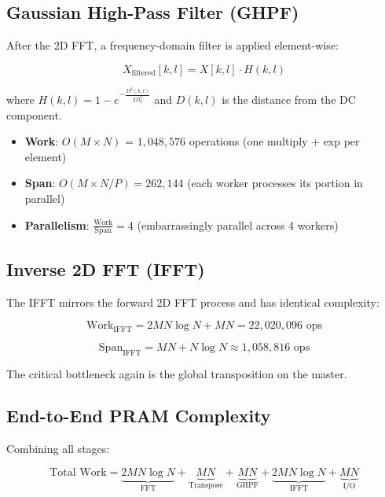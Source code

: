 \documentclass[11pt,a4paper]{article}
\begin{document}
\subsection{Gaussian High-Pass Filter (GHPF)}

After the 2D FFT, a frequency-domain filter is applied element-wise:

\[
X_{\text{filtered}}[k, l] = X[k, l] \cdot H(k, l)
\]

where $H(k, l) = 1 - e^{-\frac{D^2(k,l)}{2D_0^2}}$ and $D(k, l)$ is the distance from the DC component.

\begin{itemize}
    \item \textbf{Work}: $O(M \times N)$ = $1{,}048{,}576$ operations (one multiply + exp per element)
    \item \textbf{Span}: $O(M \times N / P) = 262{,}144$ (each worker processes its portion in parallel)
    \item \textbf{Parallelism}: $\frac{\text{Work}}{\text{Span}} = 4$ (embarrassingly parallel across 4 workers)
\end{itemize}

\subsection{Inverse 2D FFT (IFFT)}

The IFFT mirrors the forward 2D FFT process and has identical complexity:

\begin{equation}
\text{Work}_{\text{IFFT}} = 2MN \log N + MN = 22{,}020{,}096 \text{ ops}
\end{equation}

\begin{equation}
\text{Span}_{\text{IFFT}} = MN + N \log N \approx 1{,}058{,}816 \text{ ops}
\end{equation}

The critical bottleneck again is the global transposition on the master.

\subsection{End-to-End PRAM Complexity}

Combining all stages:

\begin{equation}
\text{Total Work} = \underbrace{2MN \log N}_{\text{FFT}} + \underbrace{MN}_{\text{Transpose}} + \underbrace{MN}_{\text{GHPF}} + \underbrace{2MN \log N}_{\text{IFFT}} + \underbrace{MN}_{\text{I/O}}
\end{equation}
\end{document}
